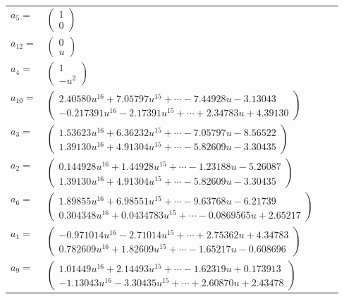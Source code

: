 \documentclass[1p]{elsarticle_modified}
\theoremstyle{definition}
\begin{document}
\begin{tabular}{m{7pt} m{180pt} m{7pt} m{180pt} }
\flushright $a_{5}=$&$\begin{pmatrix}1\\0\end{pmatrix}$ \\
\flushright $a_{12}=$&$\begin{pmatrix}0\\u\end{pmatrix}$ \\
\flushright $a_{4}=$&$\begin{pmatrix}1\\- u^2\end{pmatrix}$ \\
\flushright $a_{10}=$&$\begin{pmatrix}2.40580 u^{16}+7.05797 u^{15}+\cdots-7.44928 u-3.13043\\-0.217391 u^{16}-2.17391 u^{15}+\cdots+2.34783 u+4.39130\end{pmatrix}$ \\
\flushright $a_{3}=$&$\begin{pmatrix}1.53623 u^{16}+6.36232 u^{15}+\cdots-7.05797 u-8.56522\\1.39130 u^{16}+4.91304 u^{15}+\cdots-5.82609 u-3.30435\end{pmatrix}$ \\
\flushright $a_{2}=$&$\begin{pmatrix}0.144928 u^{16}+1.44928 u^{15}+\cdots-1.23188 u-5.26087\\1.39130 u^{16}+4.91304 u^{15}+\cdots-5.82609 u-3.30435\end{pmatrix}$ \\
\flushright $a_{6}=$&$\begin{pmatrix}1.89855 u^{16}+6.98551 u^{15}+\cdots-9.63768 u-6.21739\\0.304348 u^{16}+0.0434783 u^{15}+\cdots-0.0869565 u+2.65217\end{pmatrix}$ \\
\flushright $a_{1}=$&$\begin{pmatrix}-0.971014 u^{16}-2.71014 u^{15}+\cdots+2.75362 u+4.34783\\0.782609 u^{16}+1.82609 u^{15}+\cdots-1.65217 u-0.608696\end{pmatrix}$ \\
\flushright $a_{9}=$&$\begin{pmatrix}1.01449 u^{16}+2.14493 u^{15}+\cdots-1.62319 u+0.173913\\-1.13043 u^{16}-3.30435 u^{15}+\cdots+2.60870 u+2.43478\end{pmatrix}$ \\

\end{tabular}
\end{document}
